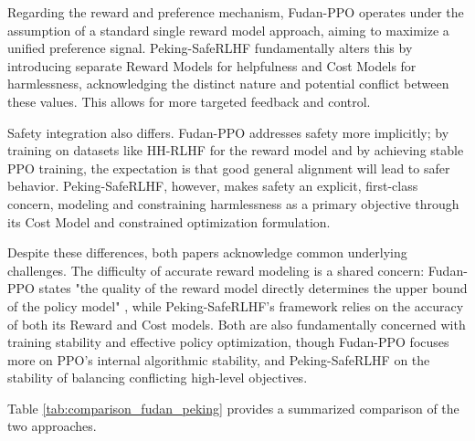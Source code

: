 \documentclass[10pt,journal,compsoc]{IEEEtran} %
\begin{document}
Regarding the reward and preference mechanism, Fudan-PPO operates under the assumption of a standard single reward model approach, aiming to maximize a unified preference signal. Peking-SafeRLHF fundamentally alters this by introducing separate Reward Models for helpfulness and Cost Models for harmlessness, acknowledging the distinct nature and potential conflict between these values. This allows for more targeted feedback and control.

Safety integration also differs. Fudan-PPO addresses safety more implicitly; by training on datasets like HH-RLHF for the reward model \cite{Zheng2023PPO} and by achieving stable PPO training, the expectation is that good general alignment will lead to safer behavior. Peking-SafeRLHF, however, makes safety an explicit, first-class concern, modeling and constraining harmlessness as a primary objective through its Cost Model and constrained optimization formulation.

Despite these differences, both papers acknowledge common underlying challenges. The difficulty of accurate reward modeling is a shared concern: Fudan-PPO states "the quality of the reward model directly determines the upper bound of the policy model" \cite{Zheng2023PPO}, while Peking-SafeRLHF's framework relies on the accuracy of both its Reward and Cost models. Both are also fundamentally concerned with training stability and effective policy optimization, though Fudan-PPO focuses more on PPO's internal algorithmic stability, and Peking-SafeRLHF on the stability of balancing conflicting high-level objectives.

Table \ref{tab:comparison_fudan_peking} provides a summarized comparison of the two approaches.
\end{document}
